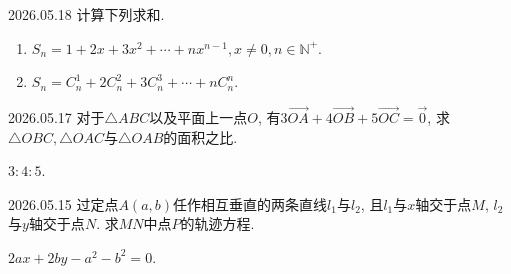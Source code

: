 \documentclass{dayMath}
\begin{document}
\begin{problem}{2026.05.18}
计算下列求和.
\begin{enumerate}
\item \(S_n=1+2x+3x^2+\cdots+nx^{n-1},x\ne 0,n\in\mathbb{N}^+\).
\item \(S_n=C_n^1+2C_n^2+3C_n^3+\cdots+nC_n^n\).
\end{enumerate}
\end{problem}


\begin{problem}{2026.05.17}
对于\(\triangle ABC\)以及平面上一点\(O\), 有\(3\overrightarrow{OA}+4\overrightarrow{OB}+5\overrightarrow{OC}=\overrightarrow{0}\), 求\(\triangle OBC,\triangle OAC\)与\(\triangle OAB\)的面积之比.
\begin{solution}
\(3:4:5\).
\end{solution}
\end{problem}


\begin{problem}{2026.05.15}
过定点\(A(a,b)\)任作相互垂直的两条直线\(l_1\)与\(l_2\), 且\(l_1\)与\(x\)轴交于点\(M\), \(l_2\)与\(y\)轴交于点\(N\). 求\(MN\)中点\(P\)的轨迹方程.
\begin{solution}
\(2ax+2by-a^2-b^2=0\).
\end{solution}
\end{problem}
\end{document}
